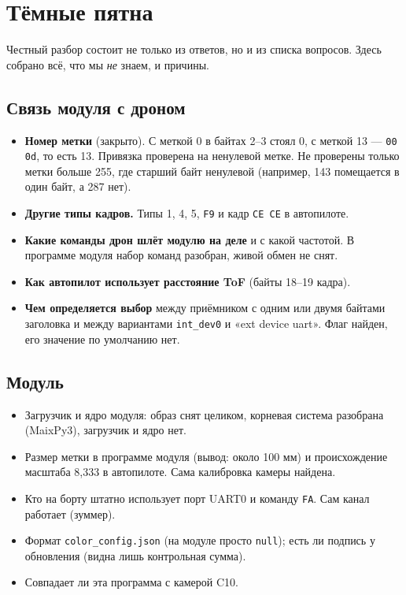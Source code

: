 \chapter{Тёмные пятна}\label{ch:pyatna}

Честный разбор состоит не только из ответов, но и из списка вопросов. Здесь собрано всё, что мы \emph{не} знаем, и причины.

\section{Связь модуля с дроном}

\begin{itemize}
  \item \textbf{Номер метки} (закрыто). С меткой 0 в байтах 2--3 стоял 0, с меткой 13 --- \texttt{00 0d}, то есть 13. Привязка проверена на ненулевой метке. Не проверены только метки больше 255, где старший байт ненулевой (например, 143 помещается в один байт, а 287 нет). \pr{}
  \item \textbf{Другие типы кадров.} Типы 1, 4, 5, \texttt{F9} и кадр \texttt{CE CE} в автопилоте. \nei{}
  \item \textbf{Какие команды дрон шлёт модулю на деле} и с какой частотой. В программе модуля набор команд разобран, живой обмен не снят. \nei{}
  \item \textbf{Как автопилот использует расстояние ToF} (байты 18--19 кадра). \nei{}
  \item \textbf{Чем определяется выбор} между приёмником с одним или двумя байтами заголовка и между вариантами \texttt{int\_dev0} и «ext device uart». Флаг найден, его значение по умолчанию нет. \nei{}
\end{itemize}

\section{Модуль}

\begin{itemize}
  \item Загрузчик и ядро модуля: образ снят целиком, корневая система разобрана (MaixPy3), загрузчик и ядро нет. \nei{}
  \item Размер метки в программе модуля (вывод: около 100 мм) и происхождение масштаба 8,333 в автопилоте. Сама калибровка камеры найдена. \nei{}
  \item Кто на борту штатно использует порт UART0 и команду \texttt{FA}. Сам канал работает (зуммер). \nei{}
  \item Формат \texttt{color\_config.json} (на модуле просто \texttt{null}); есть ли подпись у обновления (видна лишь контрольная сумма). \nei{}
  \item Совпадает ли эта программа с камерой C10. \nei{}
\end{itemize}

